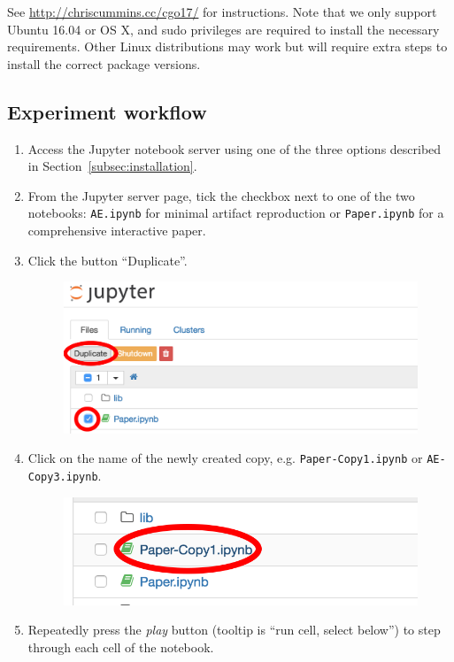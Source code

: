 See \url{http://chriscummins.cc/cgo17/} for instructions. Note that we only support Ubuntu 16.04 or OS X, and sudo privileges are required to install the necessary requirements. Other Linux distributions may work but will require extra steps to install the correct package versions.

\clearpage
\subsection{Experiment workflow}\label{subsec:workflow}

\begin{enumerate}
\item Access the Jupyter notebook server using one of the three options described in Section~\ref{subsec:installation}.
\item From the Jupyter server page, tick the checkbox next to one of the two notebooks: \texttt{AE.ipynb} for minimal artifact reproduction or \texttt{Paper.ipynb} for a comprehensive interactive paper.
\item Click the button ``Duplicate''.
\begin{figure}[H]
  \includegraphics[width=\columnwidth]{img/notebook}
\end{figure}
\item Click on the name of the newly created copy, e.g. \texttt{Paper-Copy1.ipynb} or \texttt{AE-Copy3.ipynb}.
\begin{figure}[H]
  \includegraphics[width=\columnwidth]{img/notebook-copy}
\end{figure}
\item Repeatedly press the \emph{play} button (tooltip is ``run cell, select below'') to step through each cell of the notebook.


\end{enumerate}
